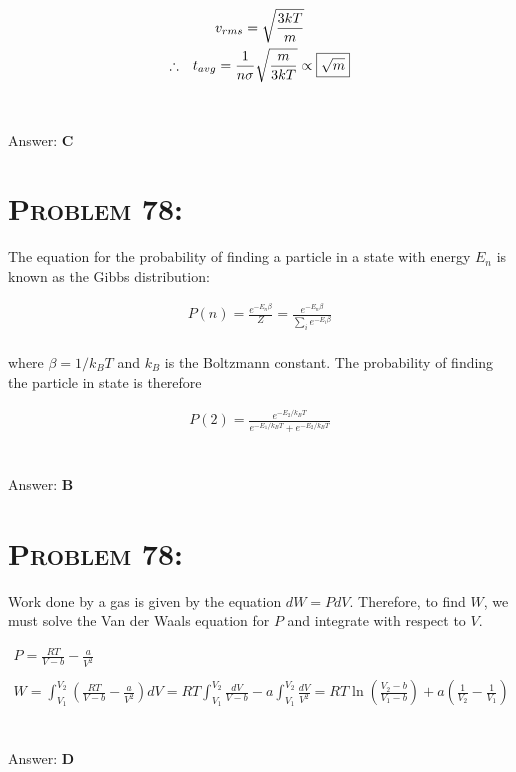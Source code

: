 \documentclass{article}
\begin{document}
\begin{gather}
v_{rms} = \sqrt{\frac{3kT}{m}}\\
\therefore \hspace{.1in} t_{avg} = \frac{1}{n \sigma} \sqrt{\frac{m}{3kT}} \propto \boxed{\sqrt{m}}
\end{gather}
\\\\
Answer: \textbf{\textcolor{ProcessBlue}C}\\


\section{\textsc{Problem 78:}} The equation for the probability of finding a particle in a state with energy $E_{n}$ is known as the Gibbs distribution:

\begin{align}
P(n) = \frac{e^{-E_{n} \beta}}{Z} =  \frac{e^{-E_{n} \beta}}{\sum_{i} e^{-E_{i} \beta}}
\end{align}
\\
where $\beta = 1/k_{B} T$ and $k_{B}$ is the Boltzmann constant. The probability of finding the particle in state is therefore

\begin{gather}
P(2) = \boxed{\frac{e^{-E_{2}/k_{B}T}}{ e^{-E_{1}/k_{B}T} +  e^{-E_{2}/k_{B}T}}}
\end{gather}
\\\\
Answer: \textbf{\textcolor{ProcessBlue}B}\\


\section{\textsc{Problem 78:}} Work done by a gas is given by the equation $dW = P dV$. Therefore, to find $W$, we must solve the Van der Waals equation for $P$ and integrate with respect to $V$.

\begin{gather}
P = \frac{RT}{V-b} - \frac{a}{V^2}\nonumber\\
\nonumber\\
W = \int_{V_{1}}^{V_{2}} \left(\frac{RT}{V-b} - \frac{a}{V^2}\right) dV = RT \int_{V_{1}}^{V_{2}} \frac{dV}{V-b} - a\int_{V_{1}}^{V_{2}} \frac{dV}{V^2} = \boxed{RT \ln{\left(\frac{V_{2}-b}{V_{1}-b}\right)} + a \left(\frac{1}{V_{2}}-\frac{1}{V_{1}}\right)}\nonumber
\end{gather}
\\\\
Answer: \textbf{\textcolor{ProcessBlue}D}\\
\end{document}
